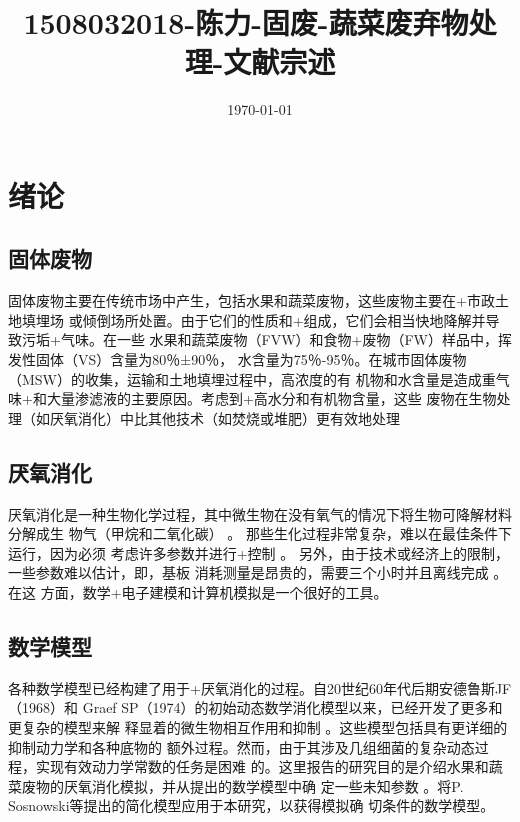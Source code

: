 \documentclass[11pt]{article}
\date{\today}
\title{1508032018-陈力-固废-蔬菜废弃物处理-文献宗述}
\begin{document}
\maketitle
\tableofcontents



\section{绪论}
\label{sec:org0d2e694}
\subsection{固体废物}
\label{sec:org616f196}
固体废物主要在传统市场中产生，包括水果和蔬菜废物，这些废物主要在+市政土地填埋场
或倾倒场所处置。由于它们的性质和+组成，它们会相当快地降解并导致污垢+气味。在一些
水果和蔬菜废物（FVW）和食物+废物（FW）样品中，挥发性固体（VS）含量为80％±90％，
水含量为75％-95％。在城市固体废物（MSW）的收集，运输和土地填埋过程中，高浓度的有
机物和水含量是造成重气味+和大量渗滤液的主要原因。考虑到+高水分和有机物含量，这些
废物在生物处理（如厌氧消化）中比其他技术（如焚烧或堆肥）更有效地处理\cite{sitorus13_biogas_recov_from_anaer_diges}

\subsection{厌氧消化}
\label{sec:org78544a9}
厌氧消化是一种生物化学过程，其中微生物在没有氧气的情况下将生物可降解材料分解成生
物气（甲烷和二氧化碳）\cite{84_biogas_produc_utiliz} 。 那些生化过程非常复杂，难以在最佳条件下运行，因为必须
考虑许多参数并进行+控制\cite{deublein10_biogas_waste_renew_resour} 。 另外，由于技术或经济上的限制，一些参数难以估计，即，基板
消耗测量是昂贵的，需要三个小时并且离线完成\cite{carlos-hernandez09_fuzzy_obser_anaer_wwtp} 。在这
方面，数学+电子建模和计算机模拟是一个很好的工具。

\subsection{数学模型}
\label{sec:orgdd457ad}
各种数学模型已经构建了用于+厌氧消化的过程。自20世纪60年代后期安德鲁斯JF（1968）和
Graef SP（1974）的初始动态数学消化模型以来，已经开发了更多和更复杂的模型来解
释显着的微生物相互作用和抑制\cite{yu13_mathem_model_anaer_diges_ad} 。这些模型包括具有更详细的抑制动力学和各种底物的
额外过程。然而，由于其涉及几组细菌的复杂动态过程，实现有效动力学常数的任务是困难
的。这里报告的研究目的是介绍水果和蔬菜废物的厌氧消化模拟，并从提出的数学模型中确
定一些未知参数\cite{donoso-bravo11_model_selec_ident_valid_anaer_diges} 。将P. Sosnowski等提出的简化模型应用于本研究，以获得模拟确
切条件的数学模型。
\end{document}
